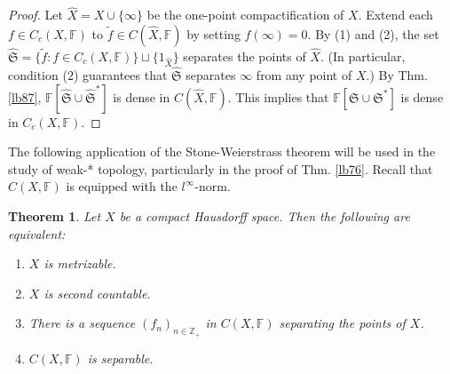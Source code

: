 \documentclass[12pt,b5paper,notitlepage]{article}
\theoremstyle{definition}
\theoremstyle{plain}
\newtheorem{thm}[df]{Theorem}
\newcommand{\fk}{\mathfrak}
\newcommand{\wtd}{\widetilde}
\newcommand{\wht}{\widehat}
\newcommand{\Zbb}{\mathbb Z}
\newcommand{\Rbb}{\mathbb R}
\newcommand{\Fbb}{\mathbb F}
\numberwithin{equation}{section}
\begin{document}
\begin{proof}
Let $\wht X=X\cup\{\infty\}$ be the one-point compactification of $X$. Extend each $f\in C_c(X,\Fbb)$ to $\wtd f\in C(\wht X,\Fbb)$ by setting $f(\infty)=0$. By (1) and (2), the set $\wht{\fk S}=\{\wtd f:f\in C_c(X,\Fbb)\}\sqcup\{1_{\wht X}\}$ separates the points of $\wht X$. (In particular, condition (2) guarantees that $\wht{\fk S}$ separates $\infty$ from any point of $X$.) By Thm. \ref{lb87}, $\Fbb[\wht{\fk S}\cup\wht{\fk S}^*]$ is dense in $C(\wht X,\Fbb)$. This implies that $\Fbb[\fk S\cup\fk S^*]$ is dense in $C_c(X,\Fbb)$.
\end{proof}



The following application of the Stone-Weierstrass theorem will be used in the study of weak-* topology, particularly in the proof of Thm. \ref{lb76}. Recall that $C(X,\Fbb)$ is equipped with the $l^\infty$-norm.

\begin{thm}\label{lb75}
Let $X$ be a compact Hausdorff space. Then the following are equivalent:
\begin{enumerate}[label=(\alph*)]
\item $X$ is metrizable.
\item $X$ is second countable.
\item There is a sequence $(f_n)_{n\in\Zbb_+}$ in $C(X,\Fbb)$ separating the points of $X$.
\item $C(X,\Fbb)$ is separable.
\end{enumerate}
\end{thm}

\begin{comment}
Moreover, if (c) is satisfied, then for each $R\in\Rbb_{>0}$, a compatible metric $d$ on $X$ can be chosen to be
\begin{gather}\label{eq34}
d(x,y)=\sum_{n\in\Zbb_+}2^{-n}\min\{|f_n(x)-f_n(y)|,R\}\qquad\text{for each }x,y\in X
\end{gather}


In particular, if (c) is satisfied and $\sup_{n\in\Zbb_+}\Vert f_n\Vert_{l^\infty}<+\infty$, we can choose $R=2\sup_{n\in\Zbb_+}\Vert f_n\Vert_{l^\infty}$. Then \eqref{eq34} becomes
\begin{gather}\label{eq35}
d(x,y)=\sum_{n\in\Zbb_+}2^{-n}|f_n(x)-f_n(y)|\qquad\text{for each }x,y\in X
\end{gather}
\end{comment}
\end{document}
